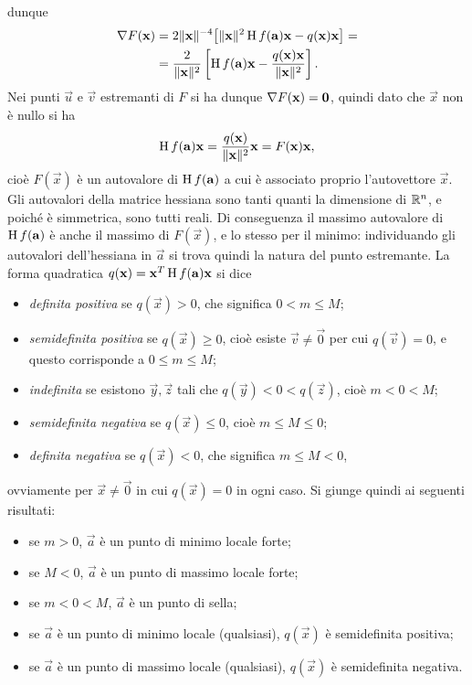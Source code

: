 dunque
\begin{equation}
\begin{split}
\nabla F(\mathbf{x})	&=2\lVert\mathbf{x}\rVert^{-4}\big[\lVert\mathbf{x}\rVert^2\operatorname{H} f(\mathbf{a})\mathbf{x}-q(\mathbf{x})\mathbf{x}\big]=\\
				&=\frac2{\lVert\mathbf{x}\rVert^2}\left[\operatorname{H} f(\mathbf{a})\mathbf{x}-\frac{q(\mathbf{x})\mathbf{x}}{\lVert\mathbf{x}\rVert^2}\right].
\end{split}
\end{equation}
Nei punti $\vec u$ e $\vec v$ estremanti di $F$ si ha dunque $\nabla F(\mathbf{x})=\mathbf{0}$, quindi dato che $\vec x$ non è nullo si ha
\begin{equation}
\operatorname{H} f(\mathbf{a})\mathbf{x}=\frac{q(\mathbf{x})}{\lVert\mathbf{x}\rVert^2}\mathbf{x}=F(\mathbf{x})\mathbf{x},
\end{equation}
cioè $F(\vec x)$ è un autovalore di $\operatorname{H} f(\mathbf{a})$ a cui è associato proprio l'autovettore $\vec x$. Gli autovalori della matrice hessiana sono tanti quanti la dimensione di $\mathbb{R}^n$, e poiché è simmetrica, sono tutti reali.
Di conseguenza il massimo autovalore di $\operatorname{H} f(\mathbf{a})$ è anche il massimo di $F(\vec x)$, e lo stesso per il minimo: individuando gli autovalori dell'hessiana in $\vec a$ si trova quindi la natura del punto estremante.
La forma quadratica $q(\mathbf{x})=\mathbf{x}^T\operatorname{H} f(\mathbf{a})\mathbf{x}$ si dice
\begin{itemize}
\item\emph{definita positiva} se $q(\vec x)>0$, che significa $0<m\leq M$;
\item\emph{semidefinita positiva} se $q(\vec x)\geq 0$, cioè esiste $\vec v\neq\vec 0$ per cui $q(\vec v)=0$, e questo corrisponde a $0\leq m\leq M$;
\item\emph{indefinita} se esistono $\vec y,\vec z$ tali che $q(\vec y)<0<q(\vec z)$, cioè $m<0<M$;
\item\emph{semidefinita negativa} se $q(\vec x)\leq 0$, cioè $m\leq M\leq 0$;
\item\emph{definita negativa} se $q(\vec x)<0$, che significa $m\leq M<0$,
\end{itemize}
ovviamente per $\vec x\neq\vec 0$ in cui $q(\vec x)=0$ in ogni caso.
Si giunge quindi ai seguenti risultati:
\begin{itemize}
\item se $m>0$, $\vec a$ è un punto di minimo locale forte;
\item se $M<0$, $\vec a$ è un punto di massimo locale forte;
\item se $m<0<M$, $\vec a$ è un punto di sella;
\item se $\vec a$ è un punto di minimo locale (qualsiasi), $q(\vec x)$ è semidefinita positiva;
\item se $\vec a$ è un punto di massimo locale (qualsiasi), $q(\vec x)$ è semidefinita negativa.
\end{itemize}
